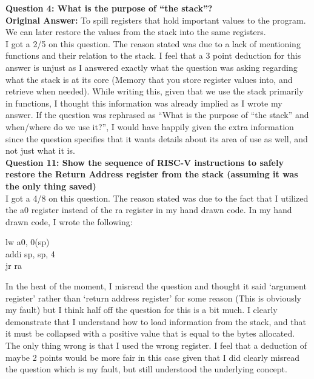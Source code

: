 \documentclass[12pt]{article}
\begin{document}
	
	\textbf{Question 4: What is the purpose of ``the stack''?} \\
	
	
	\textbf{Original Answer:} To spill registers that hold important values to the program. We can later restore the values from the stack into the same registers.  \\
	
	I got a 2/5 on this question. The reason stated was due to a lack of mentioning functions and their relation to the stack. I feel that a 3 point deduction for this answer is unjust as I answered exactly what the question was asking regarding what the stack is at its core (Memory that you store register values into, and retrieve when needed). While writing this, given that we use the stack primarily in functions, I thought this information was already implied as I wrote my answer. If the question was rephrased as ``What is the purpose of ``the stack'' and when/where do we use it?'', I would have happily given the extra information since the question specifies that it wants details about its area of use as well, and not just what it is. \vspace{1cm} \\
	
	
	\textbf{Question 11: Show the sequence of RISC-V instructions to safely restore the Return Address register from the stack (assuming it was the only thing saved)} \\
	
	I got a 4/8 on this question. The reason stated was due to the fact that I utilized the a0 register instead of the ra register in my hand drawn code. In my hand drawn code, I wrote the following: \\
	
	\begin{center}
	lw a0, 0(sp)  \\
	addi sp, sp, 4  \\
	jr ra  \\
	\end{center}
	
	In the heat of the moment, I misread the question and thought it said `argument register' rather than `return address register' for some reason (This is obviously my fault) but I think half off the question for this is a bit much. I clearly demonstrate that I understand how to load information from the stack, and that it must be collapsed with a positive value that is equal to the bytes allocated. The only thing wrong is that I used the wrong register. I feel that a deduction of maybe 2 points would be more fair in this case given that I did clearly misread the question which is my fault, but still understood the underlying concept.  \vspace{1cm} \\
	
\end{document}
